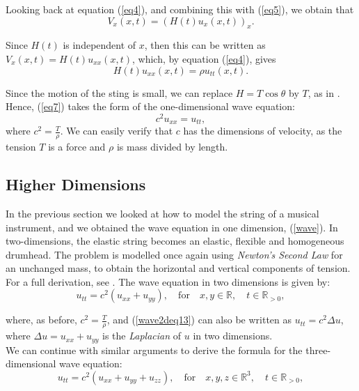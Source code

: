\documentclass[a4paper, 12pt]{article}
\numberwithin{equation}{section}
\begin{document}
Looking back at equation (\ref{eq4}), and combining this with (\ref{eq5}), we
obtain that
\begin{equation*} 
    V_x(x,t)=(H(t)u_x(x,t))_x.
\end{equation*}

Since $H(t)$ is independent of $x$, then this can be written as
$V_x(x,t)=H(t)u_{xx}(x,t)$, which, by equation (\ref{eq4}), gives
\begin {equation} \label{eq7}
    H(t)u_{xx}(x, t)=\rho u_{tt}(x,t).
\end{equation}

Since the motion of the sting is small, we can replace $H=T\cos{\theta}$ by $T$,
as in \cite[Ch. 10, App. B]{BoyDiP}. Hence, (\ref{eq7}) takes the form of the
one-dimensional wave equation:
\begin{equation} \label{wave}
    c^2u_{xx}=u_{tt}, 
\end{equation}
where $c^2=\frac{T}{\rho}$. We can easily verify that $c$ has the dimensions of
velocity, as the tension $T$ is a force and $\rho$ is mass divided by length.

\subsection{Higher Dimensions} \label{twodim}
In the previous section we looked at how to model the string of a musical
instrument, and we obtained the wave equation in one dimension, (\ref{wave}). In
two-dimensions, the elastic string becomes an elastic, flexible and homogeneous
drumhead. The problem is modelled once again using \emph{Newton's Second Law}
for an unchanged mass, to obtain the horizontal and vertical components of
tension. For a full derivation, see \cite[Ch. 12.8]{Kr}. The wave equation in
two dimensions is given by:
\begin{equation} \label{wave2deq13}
    u_{tt}=c^2(u_{xx}+u_{yy}), \quad \textrm{for} \quad x,y \in \mathbb{R}, \quad t \in \mathbb{R}_{>0},
\end{equation}

where, as before, $c^2=\frac{T}{\rho}$, and (\ref{wave2deq13}) can also be
written as $u_{tt}=c^2\Delta u$, where $\Delta u=u_{xx}+u_{yy}$ is the
\emph{Laplacian} of $u$ in two dimensions.\\

We can continue with similar arguments to derive the formula for the
three-dimensional wave equation:
\begin {equation} \label{wave3deq14}
    u_{tt}=c^2(u_{xx}+u_{yy}+u_{zz}), \quad \textrm{for}\quad x,y,z \in \mathbb{R}^3, \quad t \in \mathbb{R}_{>0},
\end{equation}
\end{document}
